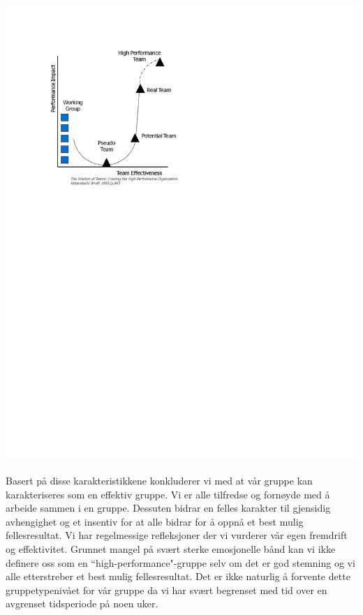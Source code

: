 \begin{enumerate}
\begin{center}
\includegraphics[clip=true, width=1 \textwidth,
trim=0cm 16cm 4cm 2cm]{Gruppetypene.pdf}
\label{fig:gruppetype}
\end{center}

\end{enumerate}

Basert på disse karakteristikkene konkluderer vi med at vår gruppe kan karakteriseres som en effektiv gruppe. Vi er alle tilfredse og fornøyde med å arbeide sammen i en gruppe. Dessuten bidrar en felles karakter til gjensidig avhengighet og et insentiv for at alle bidrar for å oppnå et best mulig fellesresultat. Vi har regelmessige refleksjoner der vi vurderer vår egen fremdrift og effektivitet. Grunnet mangel på svært sterke emosjonelle bånd kan vi ikke definere oss som en ``high-performance"-gruppe selv om det er god stemning og vi alle etterstreber et best mulig fellesresultat. Det er ikke naturlig å forvente dette gruppetypenivået for vår gruppe da vi har svært begrenset med tid over en avgrenset tidsperiode på noen uker.\\

